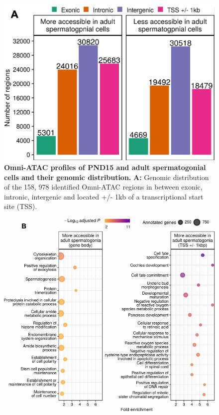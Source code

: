\documentclass[12pt,twoside]{reedthesis}
\begin{document}
\begin{subfigures}


\begin{figure}[H]

{\centering \includegraphics{thesis_files/figure-latex/ds2a-1} 

}

\caption[Omni-ATAC profiles of PND15 and adult spermatogonial cells and their genomic distribution]{\textbf{Omni-ATAC profiles of PND15 and adult spermatogonial cells and their genomic distribution.} \newline \textbf{A:} Genomic distribution of the 158, 978 identified Omni-ATAC regions in between exonic, intronic, intergenic and located +/- 1kb of a transcriptional start site (TSS).}\label{fig:ds2a}
\end{figure}

\begin{figure}[H]

{\centering \includegraphics{thesis_files/figure-latex/ds2b-1} 

}
\end{figure}
\end{subfigures}
\end{document}
